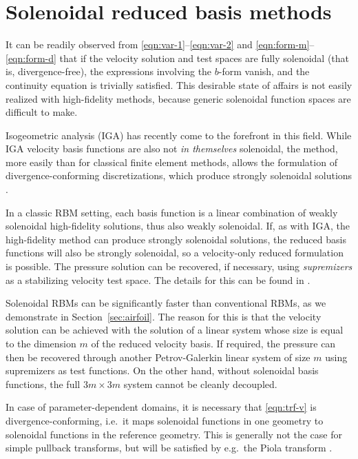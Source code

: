 \documentclass[a4paper]{jpconf}
\begin{document}
\section{Solenoidal reduced basis methods}

It can be readily observed from \eqref{eqn:var-1}--\eqref{eqn:var-2}
and \eqref{eqn:form-m}--\eqref{eqn:form-d} that if the velocity
solution and test spaces are fully solenoidal (that is,
divergence-free), the expressions involving the $b$-form vanish,
and the continuity equation is trivially satisfied.  This desirable
state of affairs is not easily realized with high-fidelity methods,
because generic solenoidal function spaces are difficult to make.

Isogeometric analysis (IGA) has recently come to the forefront in this
field.  While IGA velocity basis functions are also not
\emph{in themselves} solenoidal, the method, more easily than for
classical finite element methods, allows the formulation of
divergence-conforming discretizations, which produce strongly
solenoidal solutions
\cite{Buffa2010iae, Buffa2011ias, Evans2012dsa, Evans2013idc1,
  Evans2013idc2, Evans2013idc3, Johannessen2015dcd,Opstal2017idc}.

In a classic RBM setting, each basis function is a linear combination
of weakly solenoidal high-fidelity solutions, thus also weakly
solenoidal.  If, as with IGA, the high-fidelity method can produce
strongly solenoidal solutions, the reduced basis functions will also
be strongly solenoidal, so a velocity-only reduced formulation is
possible.  The pressure solution can be recovered, if necessary, using
\emph{supremizers} \cite{Ballarin2015ssp} as a stabilizing velocity
test space.  The details for this can be found in \cite{Fonn2018fdc}.

Solenoidal RBMs can be significantly faster than conventional RBMs, as
we demonstrate in Section~\ref{sec:airfoil}.  The reason for this is
that the velocity solution can be achieved with the solution of a
linear system whose size is equal to the dimension $m$ of the reduced
velocity basis.  If required, the pressure can then be recovered
through another Petrov-Galerkin linear system of size $m$ using
supremizers as test functions.  On the other hand, without solenoidal
basis functions, the full $3m \times 3m$ system cannot be cleanly
decoupled.

In case of parameter-dependent domains, it is necessary that
\eqref{eqn:trf-v} is divergence-conforming, i.e.~it maps solenoidal
functions in one geometry to solenoidal functions in the reference
geometry.  This is generally not the case for simple pullback
transforms, but will be satisfied by e.g.~the Piola transform
\cite[equation (64)]{Fonn2018fdc}.
\end{document}
